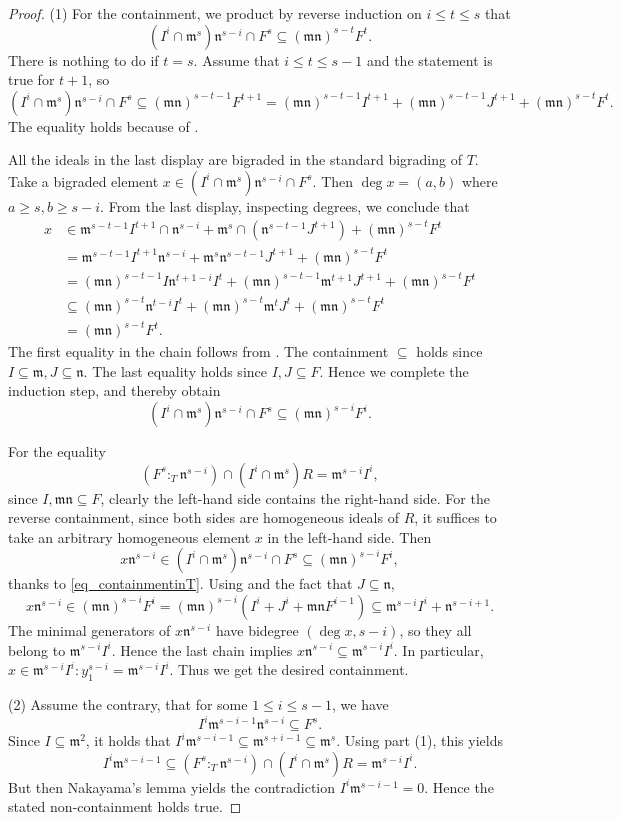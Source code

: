 \documentclass{amsart}
\newcommand{\mm}{\mathfrak{m}}
\newcommand{\nn}{\mathfrak{n}}
\theoremstyle{plain}
\theoremstyle{definition}
\numberwithin{equation}{section}
\begin{document}
\begin{proof}
(1) For the containment, we product by reverse induction on $i\le t\le s$ that
\[
(I^i\cap \mm^s)\nn^{s-i}\cap F^s \subseteq (\mm\nn)^{s-t}F^t.
\]
There is nothing to do if $t=s$. Assume that $i\le t\le s-1$ and the statement is true for $t+1$, so
\[
(I^i\cap \mm^s)\nn^{s-i}\cap F^s \subseteq (\mm\nn)^{s-t-1}F^{t+1}=(\mm\nn)^{s-t-1}I^{t+1}+(\mm\nn)^{s-t-1}J^{t+1}+(\mm\nn)^{s-t}F^t.
\]
The equality holds because of .

All the ideals in the last display are bigraded in the standard bigrading of $T$. Take a bigraded element $x\in (I^i\cap \mm^s)\nn^{s-i}\cap F^s$. Then $\deg x=(a,b)$ where $a\ge s, b\ge s-i$. From the last display, inspecting degrees, we conclude that
\begin{align*}
x&\in \mm^{s-t-1}I^{t+1}\cap \nn^{s-i}+\mm^s\cap (\nn^{s-t-1}J^{t+1})+(\mm\nn)^{s-t}F^t \\
  &=   \mm^{s-t-1}I^{t+1}\nn^{s-i}+\mm^s\nn^{s-t-1}J^{t+1}+(\mm\nn)^{s-t}F^t\\
  &=(\mm\nn)^{s-t-1}I\nn^{t+1-i}I^t+(\mm\nn)^{s-t-1}\mm^{t+1}J^{t+1}+(\mm\nn)^{s-t}F^t\\
  & \subseteq (\mm\nn)^{s-t}\nn^{t-i}I^t+(\mm\nn)^{s-t}\mm^tJ^t+(\mm\nn)^{s-t}F^t\\
  &=(\mm\nn)^{s-t}F^t.
\end{align*}
The first equality in the chain follows from . The containment $\subseteq$ holds since $I\subseteq \mm, J\subseteq \nn$. The last equality holds since $I,J\subseteq F$. Hence we complete the induction step, and thereby obtain
\begin{equation}
\label{eq_containmentinT}
(I^i\cap \mm^s)\nn^{s-i}\cap F^s \subseteq (\mm\nn)^{s-i}F^i.
\end{equation}

For the equality
\[
(F^s:_T\nn^{s-i}) \cap (I^i\cap \mm^s)R=\mm^{s-i}I^i,
\]
since $I,\mm\nn \subseteq F$, clearly the left-hand side contains the right-hand side. For the reverse containment, since both sides are homogeneous ideals of $R$, it suffices to take an arbitrary homogeneous element $x$ in the left-hand side. Then
\[
x\nn^{s-i} \in (I^i\cap \mm^s)\nn^{s-i}\cap F^s \subseteq  (\mm\nn)^{s-i}F^i,
\]
thanks to \eqref{eq_containmentinT}. Using  and the fact that $J\subseteq \nn$,
\[
x\nn^{s-i} \in (\mm\nn)^{s-i}F^i=(\mm\nn)^{s-i}(I^i+J^i+\mm\nn F^{i-1})\subseteq \mm^{s-i}I^i+\nn^{s-i+1}.
\]
The minimal generators of $x\nn^{s-i}$ have bidegree $(\deg x, s-i)$, so they all belong to $\mm^{s-i}I^i$. Hence the last chain implies 
$x\nn^{s-i} \subseteq \mm^{s-i}I^i$. In particular, $x\in \mm^{s-i}I^i:y_1^{s-i}=\mm^{s-i}I^i$. Thus we get the desired containment.

(2) Assume the contrary, that for some $1\le i\le s-1$, we have
$$
I^i\mm^{s-i-1}\nn^{s-i}\subseteq F^s.
$$
Since $I\subseteq \mm^2$, it holds that $I^i\mm^{s-i-1}\subseteq \mm^{s+i-1}\subseteq \mm^s$. Using part (1), this yields
\[
I^i\mm^{s-i-1} \subseteq (F^s:_T \nn^{s-i}) \cap (I^i\cap \mm^s)R= \mm^{s-i}I^i.
\]
But then Nakayama's lemma yields the contradiction $I^i\mm^{s-i-1}=0$. Hence the stated non-containment holds true.
\end{proof}
\end{document}
